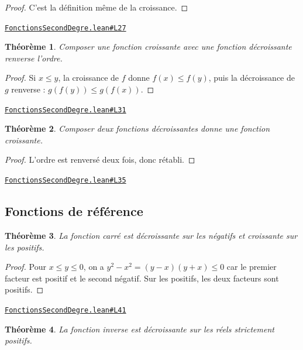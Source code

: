 \documentclass[11pt,a4paper]{article}
\theoremstyle{definition}
\theoremstyle{plain}
\newtheorem{theoreme}{Théorème}
\newcommand{\source}[2]{\par\smallskip\noindent\hfill{\footnotesize\href{#1}{\texttt{#2}}}\par\smallskip}
\begin{document}
\begin{proof}
C'est la définition même de la croissance.
\end{proof}
\source{https://github.com/Commutator-IO/learn-lean/blob/main/cours/02-lycee/02-fonctions-second-degre/FonctionsSecondDegre.lean\#L27}{FonctionsSecondDegre.lean\#L27}

\begin{theoreme}
Composer une fonction croissante avec une fonction décroissante renverse l'ordre.
\end{theoreme}

\begin{proof}
Si $x \le y$, la croissance de $f$ donne $f(x) \le f(y)$, puis la décroissance de $g$
renverse : $g(f(y)) \le g(f(x))$.
\end{proof}
\source{https://github.com/Commutator-IO/learn-lean/blob/main/cours/02-lycee/02-fonctions-second-degre/FonctionsSecondDegre.lean\#L31}{FonctionsSecondDegre.lean\#L31}

\begin{theoreme}
Composer deux fonctions décroissantes donne une fonction croissante.
\end{theoreme}

\begin{proof}
L'ordre est renversé deux fois, donc rétabli.
\end{proof}
\source{https://github.com/Commutator-IO/learn-lean/blob/main/cours/02-lycee/02-fonctions-second-degre/FonctionsSecondDegre.lean\#L35}{FonctionsSecondDegre.lean\#L35}

\subsection{Fonctions de référence}

\begin{theoreme}
La fonction carré est décroissante sur les négatifs et croissante sur les positifs.
\end{theoreme}

\begin{proof}
Pour $x \le y \le 0$, on a $y^2 - x^2 = (y-x)(y+x) \le 0$ car le premier facteur est
positif et le second négatif. Sur les positifs, les deux facteurs sont positifs.
\end{proof}
\source{https://github.com/Commutator-IO/learn-lean/blob/main/cours/02-lycee/02-fonctions-second-degre/FonctionsSecondDegre.lean\#L41}{FonctionsSecondDegre.lean\#L41}

\begin{theoreme}
La fonction inverse est décroissante sur les réels strictement positifs.
\end{theoreme}
\end{document}

